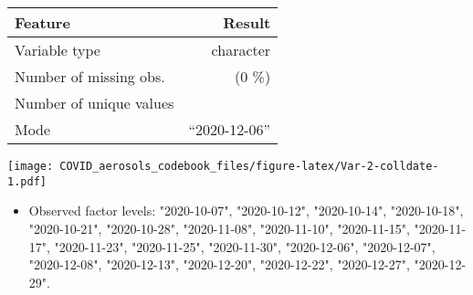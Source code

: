 \documentclass[]{article}
\providecommand{\tightlist}{%
  \setlength{\itemsep}{0pt}\setlength{\parskip}{0pt}}
\begin{document}
\begin{minipage}{0.75 \textwidth}

\begin{longtable}[]{@{}lr@{}}
\toprule
\begin{minipage}[b]{0.34\columnwidth}\raggedright
Feature\strut
\end{minipage} & \begin{minipage}[b]{0.20\columnwidth}\raggedleft
Result\strut
\end{minipage}\tabularnewline
\midrule
\endhead
\begin{minipage}[t]{0.34\columnwidth}\raggedright
Variable type\strut
\end{minipage} & \begin{minipage}[t]{0.20\columnwidth}\raggedleft
character\strut
\end{minipage}\tabularnewline
\begin{minipage}[t]{0.34\columnwidth}\raggedright
Number of missing obs.\strut
\end{minipage} & \begin{minipage}[t]{0.20\columnwidth}\raggedleft
0 (0 \%)\strut
\end{minipage}\tabularnewline
\begin{minipage}[t]{0.34\columnwidth}\raggedright
Number of unique values\strut
\end{minipage} & \begin{minipage}[t]{0.20\columnwidth}\raggedleft
21\strut
\end{minipage}\tabularnewline
\begin{minipage}[t]{0.34\columnwidth}\raggedright
Mode\strut
\end{minipage} & \begin{minipage}[t]{0.20\columnwidth}\raggedleft
``2020-12-06''\strut
\end{minipage}\tabularnewline
\bottomrule
\end{longtable}

\end{minipage}
\begin{minipage}{0.25 \textwidth}

\texttt{[image: COVID\_aerosols\_codebook\_files/figure-latex/Var-2-colldate-1.pdf]}

\end{minipage}

\begin{itemize}
\tightlist
\item
  Observed factor levels: "2020-10-07", "2020-10-12", "2020-10-14",
  "2020-10-18", "2020-10-21", "2020-10-28", "2020-11-08", "2020-11-10",
  "2020-11-15", "2020-11-17", "2020-11-23", "2020-11-25", "2020-11-30",
  "2020-12-06", "2020-12-07", "2020-12-08", "2020-12-13", "2020-12-20",
  "2020-12-22", "2020-12-27", "2020-12-29".
\end{itemize}
\end{document}
